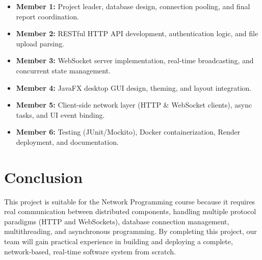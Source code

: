 \documentclass[11pt]{article}
\begin{document}
\begin{itemize}
    \item \textbf{Member 1:} Project leader, database design, connection pooling, and final report coordination.
    \item \textbf{Member 2:} RESTful HTTP API development, authentication logic, and file upload parsing.
    \item \textbf{Member 3:} WebSocket server implementation, real-time broadcasting, and concurrent state management.
    \item \textbf{Member 4:} JavaFX desktop GUI design, theming, and layout integration.
    \item \textbf{Member 5:} Client-side network layer (HTTP \& WebSocket clients), async tasks, and UI event binding.
    \item \textbf{Member 6:} Testing (JUnit/Mockito), Docker containerization, Render deployment, and documentation.
\end{itemize}

\section{Conclusion}

This project is suitable for the Network Programming course because it requires real communication between distributed components, handling multiple protocol paradigms (HTTP and WebSockets), database connection management, multithreading, and asynchronous programming. By completing this project, our team will gain practical experience in building and deploying a complete, network-based, real-time software system from scratch.
\end{document}
